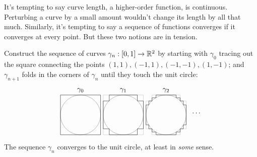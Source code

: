\documentclass[a5paper]{scrbook}
\begin{document}
\begin{example}
  It's tempting to say curve length, a higher-order function, is continuous. Perturbing a curve by a small amount wouldn't change its length by all that much. Similarly, it's tempting to say a sequence of functions converges if it converges at every point. But these two notions are in tension.

  Construct the sequence of curves \(\gamma_n:[0,1]\to\mathbb{R}^2\) by starting with \(\gamma_0\) tracing out the square connecting the points \((1,1), (-1,1), (-1,-1), (1,-1)\);
  and \(\gamma_{n+1}\) folds in the corners of \(\gamma_n\) until they touch the unit circle:
  \[
    \begin{matrix}
      \begin{tikzpicture}
        \draw (0,1) coordinate[label=above:\(\gamma_0\)];
        \draw[gray] (0,0) circle (1);
        \draw (-1,-1) rectangle (1,1);
      \end{tikzpicture}
      \
      \begin{tikzpicture}
        \draw (0,1) coordinate[label=above:\(\gamma_1\)];
        \draw[gray] (0,0) circle (1);
        \draw[lightgray] (-1,-1) rectangle (1,1);
        \draw (1,0) -- (1,.7) -- (.7,.7) -- (.7,1) -- (0,1); 
        \draw (1,-0) -- (1,-.7) -- (.7,-.7) -- (.7,-1) -- (0,-1); 
        \draw (-1,-0) -- (-1,-.7) -- (-.7,-.7) -- (-.7,-1) -- (0,-1); 
        \draw (-1,0) -- (-1,.7) -- (-.7,.7) -- (-.7,1) -- (0,1); 
      \end{tikzpicture}
      \
      \begin{tikzpicture}
        \draw (0,1) coordinate[label=above:\(\gamma_2\)];
        \draw[gray] (0,0) circle (1);
        \draw[lightgray] (1,0) -- (1,.7) -- (.7,.7) -- (.7,1) -- (0,1); 
        \draw[lightgray] (1,-0) -- (1,-.7) -- (.7,-.7) -- (.7,-1) -- (0,-1); 
        \draw[lightgray] (-1,-0) -- (-1,-.7) -- (-.7,-.7) -- (-.7,-1) -- (0,-1); 
        \draw[lightgray] (-1,0) -- (-1,.7) -- (-.7,.7) -- (-.7,1) -- (0,1); 
        \draw (1,0) -- (1,.5) --(.86,.5) -- (.86,.7) -- (.7,.7) -- (.7,.86) -- (.5,.86) -- (.5,1) --(0,1); 
        \draw (1,-0) -- (1,-.5) --(.86,-.5) -- (.86,-.7) -- (.7,-.7) -- (.7,-.86) -- (.5,-.86) -- (.5,-1) --(0,-1); 
        \draw (-1,-0) -- (-1,-.5) --(-.86,-.5) -- (-.86,-.7) -- (-.7,-.7) -- (-.7,-.86) -- (-.5,-.86) -- (-.5,-1) --(0,-1); 
        \draw (-1,0) --  (-1,.5) -- (-.86,.5) --  (-.86,.7) --  (-.7,.7) --  (-.7,.86) --  (-.5,.86) --  (-.5,1) --(0,1); 
      \end{tikzpicture}
    \end{matrix}
    \ \ 
    \dots
  \]
  The sequence \(\gamma_n\) converges to the unit circle, at least in \emph{some} sense. 


\end{example}
\end{document}
